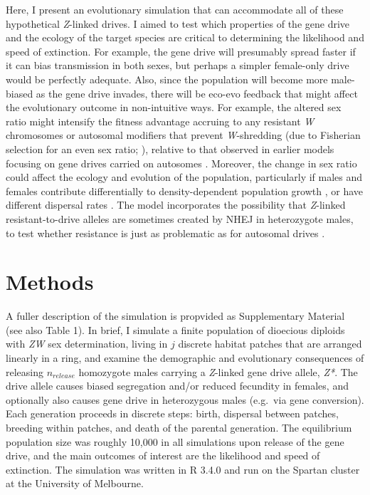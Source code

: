 \documentclass[]{rsos}%
\begin{document}
Here, I present an evolutionary simulation that can accommodate all of
these hypothetical \emph{Z}-linked drives. I aimed to test which
properties of the gene drive and the ecology of the target species are
critical to determining the likelihood and speed of extinction. For
example, the gene drive will presumably spread faster if it can bias
transmission in both sexes, but perhaps a simpler female-only drive
would be perfectly adequate. Also, since the population will become more
male-biased as the gene drive invades, there will be eco-evo feedback
that might affect the evolutionary outcome in non-intuitive ways. For
example, the altered sex ratio might intensify the fitness advantage
accruing to any resistant \emph{W} chromosomes or autosomal modifiers
that prevent \emph{W}-shredding (due to Fisherian selection for an even
sex ratio; \citep{holman2015co}), relative to that observed in earlier
models focusing on gene drives carried on autosomes
\citep{unckless2017ev, drury2017cr}. Moreover, the change in sex ratio
could affect the ecology and evolution of the population, particularly
if males and females contribute differentially to density-dependent
population growth \citep{rankin2007ma, li2019int}, or have different
dispersal rates \citep{li2019sex}. The model incorporates the
possibility that \emph{Z}-linked resistant-to-drive alleles are
sometimes created by NHEJ in heterozygote males, to test whether
resistance is just as problematic as for autosomal drives
\citep{gantz2015mu, gantz2015hi, hammond2016cr, wang2016cr, unckless2017ev}.

\hypertarget{methods}{%
\section{Methods}\label{methods}}

A fuller description of the simulation is propvided as Supplementary
Material (see also Table 1). In brief, I simulate a finite population of
dioecious diploids with \emph{ZW} sex determination, living in \(j\)
discrete habitat patches that are arranged linearly in a ring, and
examine the demographic and evolutionary consequences of releasing
\(n_{release}\) homozygote males carrying a \emph{Z}-linked gene drive
allele, \emph{Z*}. The drive allele causes biased segregation and/or
reduced fecundity in females, and optionally also causes gene drive in
heterozygous males (e.g.~via gene conversion). Each generation proceeds
in discrete steps: birth, dispersal between patches, breeding within
patches, and death of the parental generation. The equilibrium
population size was roughly 10,000 in all simulations upon release of
the gene drive, and the main outcomes of interest are the likelihood and
speed of extinction. The simulation was written in R 3.4.0 and run on
the Spartan cluster at the University of Melbourne.
\end{document}
